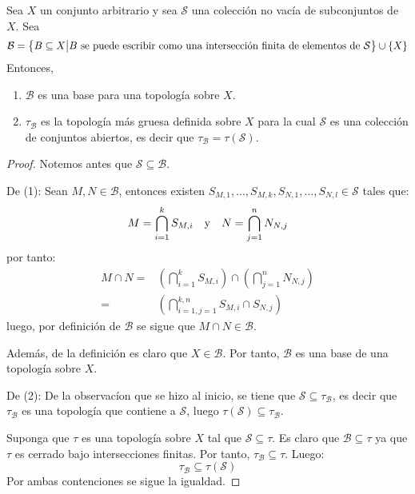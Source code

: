 \documentclass[12pt]{report}
\theoremstyle{largebreak}
\begin{document}
    \begin{propo}
        Sea $X$ un conjunto arbitrario y sea $\mathcal{S}$ una colección no vacía de subconjuntos de $X$. Sea 
        \begin{equation*}
            \mathcal{B}=\left\{B\subseteq X\big| B\textup{ se puede escribir como una intersección finita de elementos de }\mathcal{S} \right\}\cup\left\{X\right\}
        \end{equation*}
        Entonces, 
        \begin{enumerate}
            \item $\mathcal{B}$ es una base para una topología sobre $X$.
            \item $\tau_{\mathcal{B}}$ es la topología más gruesa definida sobre $X$ para la cual $\mathcal{S}$ es una colección de conjuntos abiertos, es decir que $\tau_{\mathcal{B}}=\tau(\mathcal{S})$.
        \end{enumerate}
    \end{propo}

    \begin{proof}
        Notemos antes que $\mathcal{S}\subseteq\mathcal{B}$.

        De (1): Sean $M,N\in\mathcal{B}$, entonces existen $S_{M,1},...,S_{M,k},S_{N,1},...,S_{N,l}\in\mathcal{S}$ tales que:
        \begin{equation*}
            M=\bigcap_{i=1 }^kS_{M,i }\quad \textup{y}\quad N=\bigcap_{j=1 }^nN_{N,j }
        \end{equation*}
        por tanto:
        \begin{equation*}
            \begin{split}
                M\cap N=&\left(\bigcap_{i=1 }^kS_{M,i }\right)\cap\left(\bigcap_{j=1 }^nN_{N,j }\right) \\
                =&\left(\bigcap_{i=1,j=1 }^{k,n } S_{M,i }\cap S_{N,j }  \right)
            \end{split}
        \end{equation*}
        luego, por definición de $\mathcal{B}$ se sigue que $M\cap N\in\mathcal{B}$.

        Además, de la definición es claro que $X\in\mathcal{B}$. Por tanto, $\mathcal{B}$ es una base de una topología sobre $X$.

        De (2): De la observacíon que se hizo al inicio, se tiene que $\mathcal{S}\subseteq\tau_{\mathcal{B}}$, es decir que $\tau_{\mathcal{B}}$ es una topología que contiene a $\mathcal{S}$, luego $\tau(\mathcal{S})\subseteq \tau_{\mathcal{B}}$.

        Suponga que $\tau$ es una topología sobre $X$ tal que $\mathcal{S}\subseteq\tau$. Es claro que $\mathcal{B}\subseteq\tau$ ya que $\tau$ es cerrado bajo intersecciones finitas. Por tanto, $\tau_{\mathcal{B}}\subseteq\tau$. Luego:
        \begin{equation*}
            \tau_{\mathcal{B}}\subseteq\tau(\mathcal{S})
        \end{equation*}
        Por ambas contenciones se sigue la igualdad.
    \end{proof}
\end{document}
